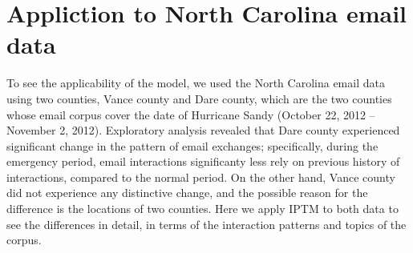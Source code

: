 \documentclass[a4paper]{article}
\begin{document}
\section{Appliction to North Carolina email data}
To see the applicability of the model, we used the North Carolina email data using two counties, Vance county and Dare county, which are the two counties whose email corpus cover the date of Hurricane Sandy (October 22, 2012 – November 2, 2012). Exploratory analysis revealed that Dare county experienced significant change in the pattern of email exchanges; specifically, during the emergency period, email interactions significanty less rely on previous history of interactions, compared to the normal period. On the other hand, Vance county did not experience any distinctive change, and the possible reason for the difference is the locations of two counties. Here we apply IPTM to both data to see the differences in detail, in terms of the interaction patterns and topics of the corpus.
\end{document}
